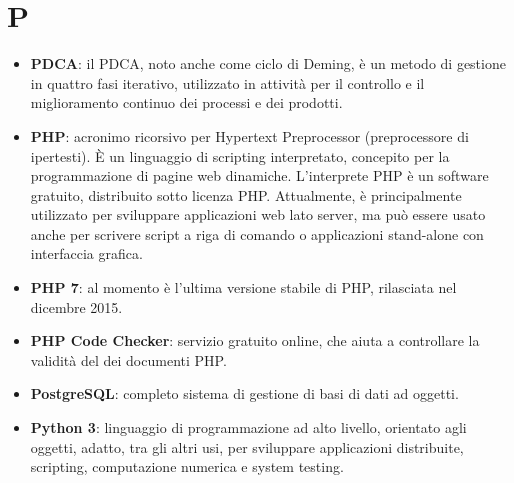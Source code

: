 \section{P}
\begin{itemize} 
	\item \textbf{PDCA}: il PDCA, noto anche come ciclo di Deming, è un metodo di gestione in quattro fasi iterativo, utilizzato in attività per il controllo e il miglioramento continuo dei processi e dei prodotti. 
	\item \textbf{PHP}: acronimo ricorsivo per Hypertext Preprocessor (preprocessore di ipertesti). \MakeUppercase{è} un linguaggio di scripting interpretato, concepito per la programmazione di pagine web dinamiche. L'interprete PHP è un software gratuito, distribuito sotto licenza PHP. Attualmente, è principalmente utilizzato per sviluppare applicazioni web lato server, ma può essere usato anche per scrivere script a riga di comando o applicazioni stand-alone con interfaccia grafica.
	\item \textbf{PHP 7}: al momento è l'ultima versione stabile di PHP, rilasciata nel dicembre 2015.
	\item \textbf{PHP Code Checker}: servizio gratuito online, che aiuta a controllare la validità del dei documenti PHP.
	\item \textbf{PostgreSQL}: completo sistema di gestione di basi di dati ad oggetti.
	\item \textbf{Python 3}: linguaggio di programmazione ad alto livello, orientato agli oggetti, adatto, tra gli altri usi, per sviluppare applicazioni distribuite, scripting, computazione numerica e system testing.
\end{itemize}

